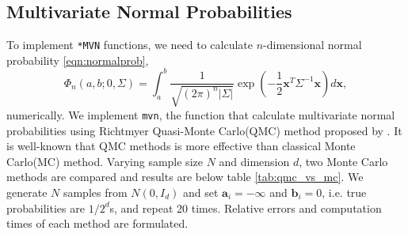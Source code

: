 \subsection{Multivariate Normal Probabilities} 

To implement \texttt{*MVN} functions, we need to calculate $n$-dimensional normal probability \eqref{eqn:normalprob},
$$
\Phi_n(a, b; 0, \Sigma) = \int_a^b \frac{1}{\sqrt{(2\pi)^n |\Sigma|}} \exp\left( -\frac{1}{2} \mathbf{x}^T \Sigma^{-1} \mathbf{x} \right) d\mathbf{x},
$$ 
numerically. We implement \texttt{mvn}, the function that calculate multivariate normal probabilities using Richtmyer Quasi-Monte Carlo(QMC) method proposed by \citet{genz2009computation}. It is well-known that QMC methods is more effective than classical Monte Carlo(MC) method. Varying sample size $N$ and dimension $d$, two Monte Carlo methods are compared and results are below table \ref{tab:qmc_vs_mc}. We generate $N$ samples from $N(0, I_d)$ and set $\mathbf{a}_i = -\infty$ and $\mathbf{b}_i = 0$, i.e. true probabilities are $1/2^d$s, and repeat 20 times. Relative errors and computation times of each method are formulated.


